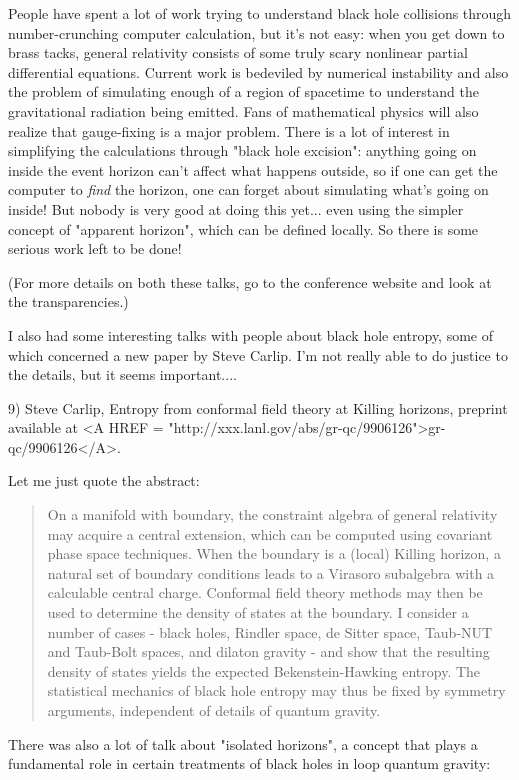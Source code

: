 People have spent a lot of work trying to understand black hole
collisions through number-crunching computer calculation, but 
it's not easy: when you get down to brass tacks, general relativity 
consists of some truly scary nonlinear partial differential equations.
Current work is bedeviled by numerical instability and also the 
problem of simulating enough of a region of spacetime to understand
the gravitational radiation being emitted.  Fans of mathematical
physics will also realize that gauge-fixing is a major problem.
There is a lot of interest in simplifying the calculations through
"black hole excision": anything going on inside the event horizon 
can't affect what happens outside, so if one can get the computer
to \emph{find} the horizon, one can forget about simulating what's going
on inside!  But nobody is very good at doing this yet... even using
the simpler concept of "apparent horizon", which can be defined
locally.  So there is some serious work left to be done! 

(For more details on both these talks, go to the conference website
and look at the transparencies.)

I also had some interesting talks with people about black hole entropy, 
some of which concerned a new paper by Steve Carlip.  I'm not really 
able to do justice to the details, but it seems important....

9) Steve Carlip, Entropy from conformal field theory at Killing 
horizons, preprint available at <A HREF = "http://xxx.lanl.gov/abs/gr-qc/9906126">gr-qc/9906126</A>.

Let me just quote the abstract:
 
\begin{quote}
     On a manifold with boundary, the constraint algebra of general 
     relativity may acquire a central extension, which can be computed 
     using covariant phase space techniques.  When the boundary is a 
     (local) Killing horizon, a natural set of boundary conditions 
     leads to a Virasoro subalgebra with a calculable central charge. 
     Conformal field theory methods may then be used to determine the
     density of states at the boundary.  I consider a number of cases -
     black holes, Rindler space, de Sitter space, Taub-NUT and Taub-Bolt 
     spaces, and dilaton gravity - and show that the resulting density 
     of states yields the expected Bekenstein-Hawking entropy.  The 
     statistical mechanics of black hole entropy may thus be fixed 
     by symmetry arguments, independent of details of quantum gravity.
\end{quote}
There was also a lot of talk about "isolated horizons", a concept
that plays a fundamental role in certain treatments of black holes
in loop quantum gravity:

